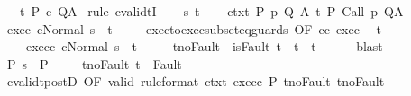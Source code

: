 \begin{isabellebody}
\ \ \ {\isachardoublequoteopen}{\isasymGamma}{\isacharcomma}{\isasymTheta}{\isasymTurnstile}\isactrlsub t\isactrlbsub {\isacharslash}{\isacharbraceleft}{\isacharbraceright}\isactrlesub \ P\ c\ Q{\isacharcomma}A{\isachardoublequoteclose}\isanewline
%
\isadelimproof
%
\endisadelimproof
%
\isatagproof
{}\isamarkupfalse%
\ {\isacharparenleft}rule\ cvalidtI{\isacharparenright}\isanewline
\ \ \isamarkupfalse%
\ s\ t\isanewline
\ \ \isamarkupfalse%
\ ctxt{\isacharcolon}\ {\isachardoublequoteopen}{\isasymforall}{\isacharparenleft}P{\isacharcomma}\ p{\isacharcomma}\ Q{\isacharcomma}\ A{\isacharparenright}{\isasymin}{\isasymTheta}{\isachardot}\ {\isasymGamma}{\isasymTurnstile}\isactrlsub t\isactrlbsub {\isacharslash}{\isacharbraceleft}{\isacharbraceright}\isactrlesub \ P\ {\isacharparenleft}Call\ p{\isacharparenright}\ Q{\isacharcomma}A{\isachardoublequoteclose}\ \isanewline
\ \ \isamarkupfalse%
\ exec{\isacharcolon}\ {\isachardoublequoteopen}{\isasymGamma}{\isasymturnstile}{\isasymlangle}c{\isacharcomma}Normal\ s{\isasymrangle}\ {\isasymRightarrow}\ t{\isachardoublequoteclose}\ \isanewline
\ \ \isamarkupfalse%
\ exec{\isacharunderscore}to{\isacharunderscore}exec{\isacharunderscore}subseteq{\isacharunderscore}guards\ {\isacharbrackleft}OF\ c{\isacharunderscore}c{\isacharprime}\ exec{\isacharbrackright}\ \isamarkupfalse%
\ t{\isacharprime}\ \isanewline
\ \ \ \ exec{\isacharunderscore}c{\isacharprime}{\isacharcolon}\ {\isachardoublequoteopen}{\isasymGamma}{\isasymturnstile}{\isasymlangle}c{\isacharprime}{\isacharcomma}Normal\ s{\isasymrangle}\ {\isasymRightarrow}\ t{\isacharprime}{\isachardoublequoteclose}\ \isanewline
\ \ \ \ t{\isacharprime}{\isacharunderscore}noFault{\isacharcolon}\ {\isachardoublequoteopen}{\isasymnot}\ isFault\ t{\isacharprime}\ {\isasymlongrightarrow}\ t{\isacharprime}\ {\isacharequal}\ t{\isachardoublequoteclose}\isanewline
\ \ \ \ \isamarkupfalse%
\ blast\isanewline
\ \ \isamarkupfalse%
\ P{\isacharcolon}\ {\isachardoublequoteopen}s\ {\isasymin}\ P{\isachardoublequoteclose}\ \isanewline
\ \ \isamarkupfalse%
\ t{\isacharunderscore}noFault{\isacharcolon}\ {\isachardoublequoteopen}t\ {\isasymnotin}\ Fault\ {\isacharbackquote}\ {\isacharbraceleft}{\isacharbraceright}{\isachardoublequoteclose}\isanewline
\ \ \isamarkupfalse%
\ cvalidt{\isacharunderscore}postD\ {\isacharbrackleft}OF\ valid\ {\isacharbrackleft}rule{\isacharunderscore}format{\isacharbrackright}\ ctxt\ exec{\isacharunderscore}c{\isacharprime}\ P{\isacharbrackright}\ t{\isacharprime}{\isacharunderscore}noFault\ t{\isacharunderscore}noFault\isanewline

\end{isabellebody}
